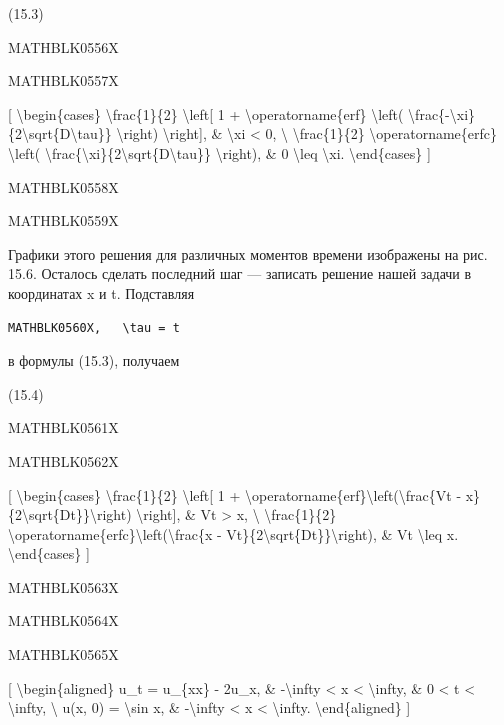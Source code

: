 \documentclass[
]{article}
\begin{document}
(15.3)

MATHBLK0556X

MATHBLK0557X

{[} \textbackslash begin\{cases\} \textbackslash frac\{1\}\{2\}
\textbackslash left{[} 1 + \textbackslash operatorname\{erf\}
\textbackslash left(
\textbackslash frac\{-\textbackslash xi\}\{2\textbackslash sqrt\{D\textbackslash tau\}\}
\textbackslash right) \textbackslash right{]}, \& \textbackslash xi
\textless{} 0, \textbackslash{} \textbackslash frac\{1\}\{2\}
\textbackslash operatorname\{erfc\} \textbackslash left(
\textbackslash frac\{\textbackslash xi\}\{2\textbackslash sqrt\{D\textbackslash tau\}\}
\textbackslash right), \& 0 \textbackslash leq \textbackslash xi.
\textbackslash end\{cases\} {]}

MATHBLK0558X

MATHBLK0559X

Графики этого решения для различных моментов времени изображены на рис.
15.6. Осталось сделать последний шаг --- записать решение нашей задачи в
координатах x и t. Подставляя

\begin{verbatim}
MATHBLK0560X,   \tau = t
\end{verbatim}

в формулы (15.3), получаем

(15.4)

MATHBLK0561X

MATHBLK0562X

{[} \textbackslash begin\{cases\} \textbackslash frac\{1\}\{2\}
\textbackslash left{[} 1 +
\textbackslash operatorname\{erf\}\textbackslash left(\textbackslash frac\{Vt
- x\}\{2\textbackslash sqrt\{Dt\}\}\textbackslash right)
\textbackslash right{]}, \& Vt \textgreater{} x, \textbackslash{}
\textbackslash frac\{1\}\{2\}
\textbackslash operatorname\{erfc\}\textbackslash left(\textbackslash frac\{x
- Vt\}\{2\textbackslash sqrt\{Dt\}\}\textbackslash right), \& Vt
\textbackslash leq x. \textbackslash end\{cases\} {]}

MATHBLK0563X

MATHBLK0564X

MATHBLK0565X

{[} \textbackslash begin\{aligned\} u\_t = u\_\{xx\} - 2u\_x, \&
-\textbackslash infty \textless{} x \textless{} \textbackslash infty, \&
0 \textless{} t \textless{} \textbackslash infty, \textbackslash{} u(x,
0) = \textbackslash sin x, \& -\textbackslash infty \textless{} x
\textless{} \textbackslash infty. \textbackslash end\{aligned\} {]}
\end{document}
